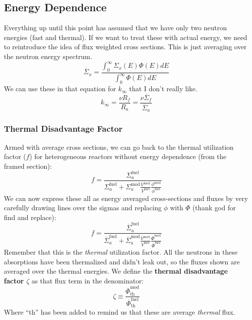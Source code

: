 \documentclass[letter]{article}
\begin{document}
\subsection{Energy Dependence}

Everything up until this point has assumed that we have only two
neutron energies (fast and thermal). If we want to treat these with
actual energy, we need to reintroduce the idea of flux weighted cross
sections. This is just averaging over the neutron energy
spectrum.\cite[Lec. 13]{lecture}
\begin{equation*}
  \overline{\Sigma}_x=\frac{\int^\infty_0\Sigma_x(E)\Phi(E)dE}{\int^\infty_0\Phi(E)dE}
\end{equation*}
We can use these in that equation for $k_\infty$ that I don't really
like.\cite[Lec. 13]{lecture}
\begin{equation*}
  k_\infty=\frac{\nu{}R_f}{R_a}=\frac{\nu{}\overline{\Sigma}_f}{\overline{\Sigma}_a}
\end{equation*}

\subsubsection{Thermal Disadvantage Factor}

Armed with average cross sections, we can go back to the thermal
utilization factor ($f$) for heterogeneous reactors without energy
dependence (from the framed section):
\begin{equation*}
    f=\frac{\Sigma^{\text{fuel}}_a}{\Sigma^{\text{fuel}}_a+\Sigma^{\text{mod}}_a\frac{V^{\text{mod}}}{V^{\text{fuel}}}\frac{\phi^{\text{mod}}}{\phi^{\text{fuel}}}}
\end{equation*}
We can now express these all as energy averaged cross-sections and
fluxes by very carefully drawing lines over the sigmas and replacing
$\phi$ with $\Phi$ (thank god for find and replace):
\begin{equation*}
    f=\frac{\overline{\Sigma}^{\text{fuel}}_a}{\overline{\Sigma}^{\text{fuel}}_a+\overline{\Sigma}^{\text{mod}}_a\frac{V^{\text{mod}}}{V^{\text{fuel}}}\frac{\overline{\Phi}^{\text{mod}}}{\overline{\Phi}^{\text{fuel}}}}
\end{equation*}
Remember that this is the \textit{thermal} utilization factor. All the
neutrons in these absorptions have been thermalized and didn't leak
out, so the fluxes shown are averaged over the thermal energies. We
define the \textbf{thermal disadvantage factor $\zeta$} as that flux
term in the denominator:
\begin{equation*}
  \zeta \equiv \frac{\overline{\Phi}^{\text{mod}}_{\text{th}}}{\overline{\Phi}^{\text{fuel}}_{\text{th}}}
\end{equation*}
Where ``th'' has been added to remind us that these are average
\textit{thermal} flux.\cite[Lec. 13]{lecture}
\end{document}
